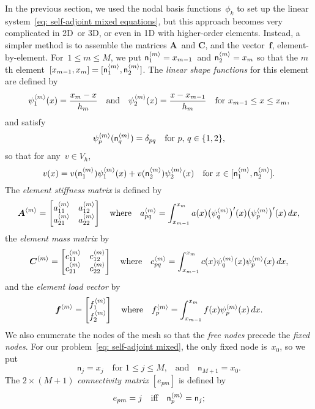 In the previous section, we used the nodal basis functions~$\phi_k$ to set up 
the linear system~\eqref{eq: self-adjoint mixed equations}, but this approach 
becomes very complicated in 2D~or 3D, or even in 1D with higher-order elements.
Instead, a simpler method is to assemble the matrices $\boldsymbol{A}$~and 
$\boldsymbol{C}$, and the vector~$\boldsymbol{f}$, element-by-element.  
For~$1\le m\le M$, we put $\mathsf{n}^{\langle m\rangle}_1=x_{m-1}$~and
$\mathsf{n}^{\langle m\rangle}_2=x_m$ so that the $m$th 
element~$[x_{m-1},x_m]=[\mathsf{n}^{\langle m\rangle}_1,\mathsf{n}^{\langle m\rangle}_2]$.  The
\emph{linear shape functions} for this element are defined by
\[
\psi^{\langle m\rangle}_1(x)=\frac{x_m-x}{h_m}
\quad\text{and}\quad
\psi^{\langle m\rangle}_2(x)=\frac{x-x_{m-1}}{h_m}
\quad\text{for $x_{m-1}\le x\le x_m$,}
\]
and satisfy
\[
\psi^{\langle m\rangle}_p(\mathsf{n}^{\langle m\rangle}_q)=\delta_{pq}
    \quad\text{for $p$, $q\in\{1,2\}$,}
\]
so that for any~$v\in V_h$,
\[
v(x)=v(\mathsf{n}^{\langle m\rangle}_1)\psi^{\langle m\rangle}_1(x)
    +v(\mathsf{n}^{\langle m\rangle}_2)\psi^{\langle m\rangle}_2(x)
    \quad\text{for $x\in[\mathsf{n}^{\langle m\rangle}_1,\mathsf{n}^{\langle m\rangle}_2]$.}
\]
The \emph{element stiffness matrix} is defined by
\[
\boldsymbol{A}^{\langle m\rangle}=\begin{bmatrix}
a^{\langle m\rangle}_{11}&a^{\langle m\rangle}_{12}\\
a^{\langle m\rangle}_{21}&a^{\langle m\rangle}_{22}\end{bmatrix}
\quad\text{where}\quad
a^{\langle m\rangle}_{pq}=\int_{x_{m-1}}^{x_m}a(x)\bigl(\psi_q^{\langle m\rangle}\bigr)'(x)
    \bigl(\psi_p^{\langle m\rangle}\bigr)'(x)\,dx,
\]
the \emph{element mass matrix} by
\[
\boldsymbol{C}^{\langle m\rangle}=\begin{bmatrix}
c^{\langle m\rangle}_{11}&c^{\langle m\rangle}_{12}\\
c^{\langle m\rangle}_{21}&c^{\langle m\rangle}_{22}\end{bmatrix}
\quad\text{where}\quad
c^{\langle m\rangle}_{pq}=\int_{x_{m-1}}^{x_m}c(x)\psi_q^{\langle m\rangle}(x) 
    \psi_p^{\langle m\rangle}(x)\,dx,
\]
and the \emph{element load vector} by
\[
\boldsymbol{f}^{\langle m\rangle}=\begin{bmatrix}f^{\langle m\rangle}_1\\ f^{\langle m\rangle}_2\end{bmatrix}
\quad\text{where}\quad
f^{\langle m\rangle}_p=\int_{x_{m-1}}^{x_m}f(x)\psi_p^{\langle m\rangle}(x)\,dx.
\]
We also enumerate the nodes of the mesh so that the \emph{free nodes} precede 
the \emph{fixed nodes}.  For our problem~\eqref{eq: self-adjoint mixed}, the 
only fixed node is~$x_0$, so we put
\[
\mathsf{n}_j=x_j\quad\text{for $1\le j\le M$,}
\quad\text{and}\quad\mathsf{n}_{M+1}=x_0.
\]
The $2\times(M+1)$ \emph{connectivity matrix} $[e_{pm}]$ is defined by
\begin{equation}\label{eq: e pm def}
e_{pm}=j\quad\text{iff}\quad\mathsf{n}^{\langle m\rangle}_p=\mathsf{n}_j;
\end{equation}
